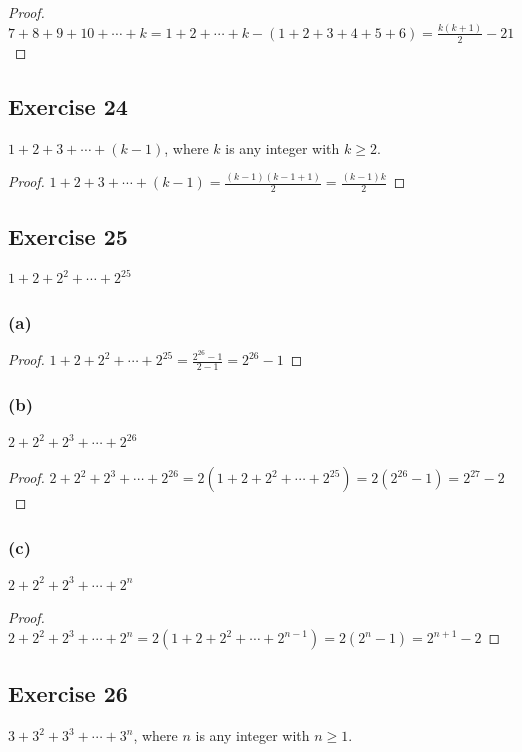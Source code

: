 \documentclass[14pt]{extarticle}
\newcommand{\dps}{\displaystyle}
\begin{document}
\begin{proof}
$\dps 7 + 8 + 9 + 10 + \cdots + k = 1 + 2 + \cdots + k - (1+2+3+4+5+6) = \frac{k(k+1)}{2} - 21$
\end{proof}

\subsection{Exercise 24}
$1 + 2 + 3 + \cdots + (k - 1)$, where $k$ is any integer with $k \geq 2$.

\begin{proof}
$\dps 1 + 2 + 3 + \cdots + (k - 1) = \frac{(k-1)(k-1+1)}{2} = \frac{(k-1)k}{2}$
\end{proof}

\subsection{Exercise 25}
$1 + 2 + 2^2 + \cdots + 2^{25}$

\subsubsection{(a)}

\begin{proof}
$\dps 1 + 2 + 2^2 + \cdots + 2^{25} = \frac{2^{26} - 1}{2-1} = 2^{26} - 1$
\end{proof}

\subsubsection{(b)}
$2 + 2^2 + 2^3 + \cdots + 2^{26}$

\begin{proof}
$2 + 2^2 + 2^3 + \cdots + 2^{26} = 2(1 + 2 + 2^2 + \cdots + 2^{25}) = 2(2^{26} - 1) = 2^{27}-2$
\end{proof}

\subsubsection{(c)}
$2 + 2^2 + 2^3 + \cdots + 2^n$

\begin{proof}
$2 + 2^2 + 2^3 + \cdots + 2^{n} = 2(1 + 2 + 2^2 + \cdots + 2^{n-1}) = 2(2^{n} - 1) = 2^{n+1}-2$
\end{proof}

\subsection{Exercise 26}
$3 + 3^2 + 3^3 + \cdots + 3^n$, where $n$ is any integer with $n \geq 1$.
\end{document}
